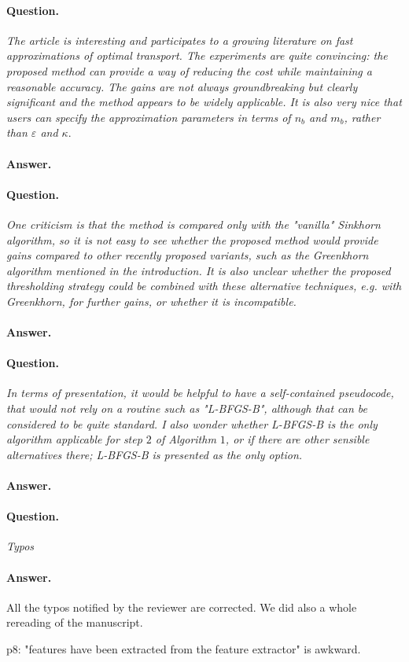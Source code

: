 \documentclass[11pt]{article}
\begin{document}
\paragraph{Question.}

\emph{The article is interesting and participates to a growing literature on fast
approximations of optimal transport. The experiments are quite convincing: the
proposed method can provide a way of reducing the cost while maintaining a
reasonable accuracy. The gains are not always groundbreaking but clearly
significant and the method appears to be widely applicable. It is also very
nice that users can specify the approximation parameters in terms of $n_b$ and
$m_b$, rather than $\varepsilon$ and $\kappa.$}

\paragraph{Answer.} 

\paragraph{Question.}

\emph{One criticism is that the method is compared only with the "vanilla"
Sinkhorn algorithm, so it is not easy to see whether the proposed method would
provide gains compared to other recently proposed variants, such as the
Greenkhorn algorithm mentioned in the introduction. It is also unclear whether
the proposed thresholding strategy could be combined with these alternative techniques, e.g. with Greenkhorn, for further gains, or whether it is incompatible.}

\paragraph{Answer.} 

\paragraph{Question.}

\emph{In terms of presentation, it would be helpful to have a self-contained
pseudocode, that would not rely on a routine such as "L-BFGS-B", although that
can be considered to be quite standard. I also wonder whether L-BFGS-B is the
only algorithm applicable for step $2$ of Algorithm $1$, or if there are other
sensible alternatives there; L-BFGS-B is presented as the only option.}

\paragraph{Answer.} 

\paragraph{Question.}

\emph{Typos}

\paragraph{Answer.} 
All the typos notified by the reviewer are corrected. We did also a whole rereading of the manuscript.

p$8$: "features have been extracted from the feature extractor" is awkward.
\end{document}

